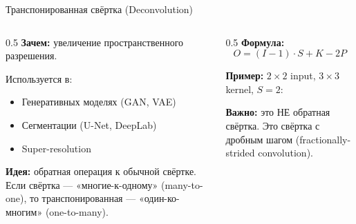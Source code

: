\documentclass[aspectratio=169, 9pt]{beamer}
\begin{document}
\begin{frame}{Транспонированная свёртка (Deconvolution)}
  \begin{columns}[T]
    \begin{column}{0.5\textwidth}
      \textbf{Зачем:} увеличение пространственного разрешения.
      
      Используется в:
      \begin{itemize}
        \item Генеративных моделях (GAN, VAE)
        \item Сегментации (U-Net, DeepLab)
        \item Super-resolution
      \end{itemize}
      
      \vspace{0.3em}
      \textbf{Идея:} обратная операция к обычной свёртке. Если свёртка — «многие-к-одному» (many-to-one), то транспонированная — «один-ко-многим» (one-to-many).
    \end{column}
    \begin{column}{0.5\textwidth}
      \textbf{Формула:}
      \[
      O = (I - 1) \cdot S + K - 2P
      \]
      
      \textbf{Пример:} $2\times2$ input, $3\times3$ kernel, $S=2$:
      
      
      \vspace{0.3em}
      \textbf{Важно:} это НЕ обратная свёртка. Это свёртка с дробным шагом (fractionally-strided convolution).
    \end{column}
  \end{columns}
\end{frame}
\end{document}
